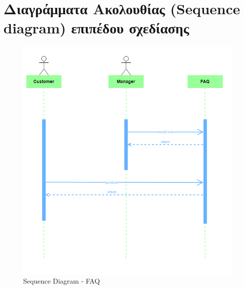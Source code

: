 \section{Διαγράμματα Ακολουθίας (Sequence diagram) επιπέδου σχεδίασης}
\begin{figure}[H]
	\centering
	\includegraphics[width=1\textwidth]{Images/Sequence-FAQ}
	\caption{Sequence Diagram - FAQ}
	\label{Sequence - FAQ}
\end{figure}

